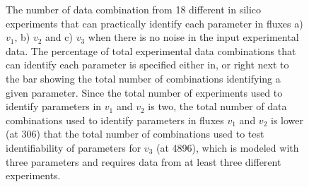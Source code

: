 \documentclass[10pt]{article}
\begin{document}
	\begin{figure}[!tbhp]
		\caption{The number of data combination from 18 different in silico experiments that can practically identify each parameter in fluxes a) $v_1$, b) $v_2$ and c) $v_3$ when there is no noise in the input experimental data. The percentage of total experimental data combinations that can identify each parameter is specified either in, or right next to the bar showing the total number of combinations identifying a given parameter. Since the total number of experiments used to identify parameters in $v_1$ and $v_2$ is two, the total number of data combinations used to identify parameters in fluxes $v_1$ and $v_2$ is lower (at 306) that the total number of combinations used to test identifiability of parameters for $v_3$ (at 4896), which is modeled with three parameters and requires data from at least three different experiments.}\label{fig:ident}
	\end{figure}
\end{document}
